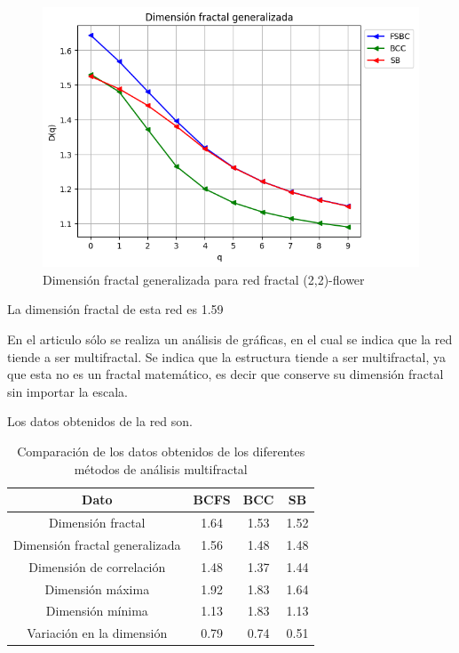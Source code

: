 \begin{figure}[H]
    \centering
    \includegraphics[scale=0.7]{Capitulo4Multifractalidad/imagenes/a_Dqflower22.png}
    \caption{Dimensión fractal generalizada para red fractal (2,2)-flower}
\end{figure}

La dimensión fractal de esta red es 1.59

En el articulo sólo se realiza un análisis de gráficas, en el cual se indica que la red tiende a ser multifractal. Se indica que la estructura tiende a ser multifractal, ya que esta no es un fractal matemático, es decir que conserve su dimensión fractal sin importar la escala.

Los datos obtenidos de la red son.

\begin{table}[H]
    \centering
    \begin{tabular}{|c|c|c|c|}
        \hline
         \textbf{Dato}& \textbf{BCFS} & \textbf{BCC} & \textbf{SB} \\
         \hline
         Dimensión fractal & 1.64 & 1.53 & 1.52\\
         \hline
         Dimensión fractal generalizada  & 1.56 & 1.48 & 1.48\\
         \hline
         Dimensión de correlación & 1.48 & 1.37 & 1.44\\
         \hline
         Dimensión máxima & 1.92 & 1.83 & 1.64 \\
         \hline
         Dimensión mínima & 1.13 & 1.83& 1.13 \\
         \hline
         Variación en la dimensión & 0.79 & 0.74 & 0.51 \\
         \hline
    \end{tabular}
    \caption{Comparación de los datos obtenidos de los diferentes métodos de análisis multifractal}
\end{table}